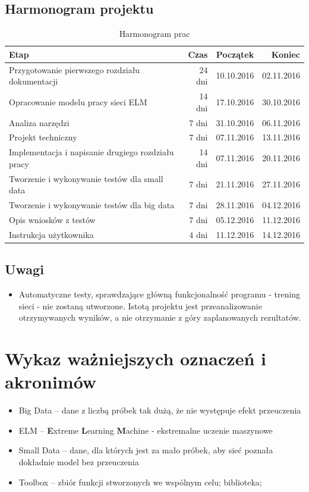 \documentclass{article}
\begin{document}
\subsection{Harmonogram projektu}
\begin{table}[H]
\caption{Harmonogram prac}
\begin{tabular}{|l|r|r|r|}
\hline
\textbf{Etap} & \textbf{Czas} & \textbf{Początek} & \textbf{Koniec} \\
\hline
Przygotowanie pierwszego rozdziału dokumentacji & 24 dni & 10.10.2016 & 02.11.2016 \\
Opracowanie modelu pracy sieci ELM & 14 dni & 17.10.2016 & 30.10.2016 \\
Analiza narzędzi & 7 dni & 31.10.2016 & 06.11.2016 \\
Projekt techniczny & 7 dni & 07.11.2016 & 13.11.2016 \\
Implementacja i napisanie drugiego rozdziału pracy & 14 dni & 07.11.2016 & 20.11.2016 \\
Tworzenie i wykonywanie testów dla small data & 7 dni & 21.11.2016 & 27.11.2016 \\
Tworzenie i wykonywanie testów dla big data & 7 dni & 28.11.2016 & 04.12.2016 \\
Opis wniosków z testów & 7 dni & 05.12.2016 & 11.12.2016 \\
Instrukcja użytkownika & 4 dni & 11.12.2016 & 14.12.2016 \\
\hline
\end{tabular}
\end{table}
\subsection{Uwagi}
\begin{itemize}
\item Automatyczne testy, sprawdzające główną funkcjonalność programu - trening sieci - nie zostaną utworzone. Istotą projektu jest przeanalizowanie otrzymywanych wyników, a nie otrzymanie z góry zaplanowanych rezultatów.
\end{itemize}
\clearpage
\section{Wykaz ważniejszych oznaczeń i akronimów}
\begin{itemize}[label={},leftmargin=*]
\item Big Data -- dane z liczbą próbek tak dużą, że nie występuje efekt przeuczenia
\item ELM -- \textbf{E}xtreme \textbf{L}earning \textbf{M}achine - ekstremalne uczenie maszynowe
\item Small Data -- dane, dla których jest za mało próbek, aby sieć poznała dokładnie model bez przeuczenia
\item Toolbox -- zbiór funkcji stworzonych we wspólnym celu; biblioteka;
\end{itemize}
\end{document}

